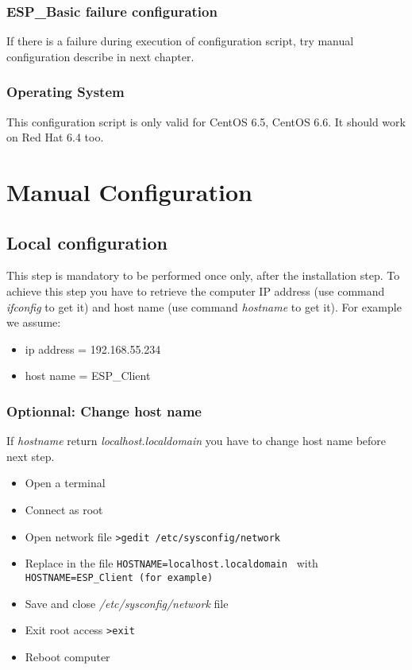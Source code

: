 \subsection{ESP\_Basic failure configuration}
If there is a failure during execution of configuration script, try manual configuration describe in next chapter.

\subsection{Operating System}
This configuration script is only valid for CentOS 6.5, CentOS 6.6. It should work on Red Hat 6.4 too.

\chapter{Manual Configuration}
\section{Local configuration}
This step is mandatory to be performed once only, after the installation step.
To achieve this step you have to retrieve the computer IP address (use command \emph{ifconfig} to get it) and host name (use command \emph{hostname} to get it).
\newline
For example we assume:
\begin{itemize}
\item ip address = 192.168.55.234
\item host name = ESP\_Client
\end{itemize}

\subsection{Optionnal: Change host name}
If \emph{hostname} return \emph{localhost.localdomain} you have to change host name before next step.
\begin{itemize}
\item Open a terminal
\item Connect as root
\item Open network file
	\newline
	\verb|>gedit /etc/sysconfig/network |
\item Replace in the file
	\newline
	\verb|HOSTNAME=localhost.localdomain |
	\newline
	with
	\newline
	\verb|HOSTNAME=ESP_Client (for example) |	
\item Save and close \emph{ /etc/sysconfig/network} file
\item Exit root access
	\newline
	\verb|>exit |
\item Reboot computer
\end{itemize}


